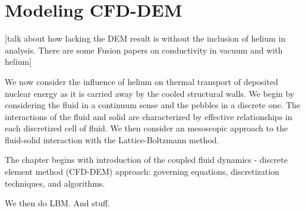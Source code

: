 \chapter{Modeling CFD-DEM} \label{modelingCFDEM}
[talk about how lacking the DEM result is without the inclusion of helium in analysis. There are some Fusion papers on conductivity in vacuum and with helium]

We now consider the influence of helium on thermal transport of deposited nuclear energy as it is carried away by the cooled structural walls. We begin by considering the fluid in a continuum sense and the pebbles in a discrete one. The interactions of the fluid and solid are characterized by effective relationships in each discretized cell of fluid. We then consider an mesoscopic approach to the fluid-solid interaction with the Lattice-Boltzmann method. 

The chapter begins with introduction of the coupled fluid dynamics - discrete element method (CFD-DEM) approach: governing equations, discretization techniques, and algorithms.

We then do LBM. And stuff.




